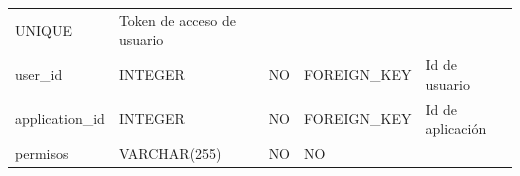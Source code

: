 \documentclass[12pt,a4paperpaper,]{report}
\begin{document}
\begin{longtable}[]{@{}lllll@{}}
\begin{minipage}[t]{0.19\columnwidth}
UNIQUE\strut
\end{minipage} & \begin{minipage}[t]{0.11\columnwidth}\raggedright\strut
Token de acceso de usuario\strut
\end{minipage}\tabularnewline
\begin{minipage}[t]{0.21\columnwidth}\raggedright\strut
user\_id\strut
\end{minipage} & \begin{minipage}[t]{0.19\columnwidth}\raggedright\strut
INTEGER\strut
\end{minipage} & \begin{minipage}[t]{0.16\columnwidth}\raggedright\strut
NO\strut
\end{minipage} & \begin{minipage}[t]{0.19\columnwidth}\raggedright\strut
FOREIGN\_KEY\strut
\end{minipage} & \begin{minipage}[t]{0.11\columnwidth}\raggedright\strut
Id de usuario\strut
\end{minipage}\tabularnewline
\begin{minipage}[t]{0.21\columnwidth}\raggedright\strut
application\_id\strut
\end{minipage} & \begin{minipage}[t]{0.19\columnwidth}\raggedright\strut
INTEGER\strut
\end{minipage} & \begin{minipage}[t]{0.16\columnwidth}\raggedright\strut
NO\strut
\end{minipage} & \begin{minipage}[t]{0.19\columnwidth}\raggedright\strut
FOREIGN\_KEY\strut
\end{minipage} & \begin{minipage}[t]{0.11\columnwidth}\raggedright\strut
Id de aplicación\strut
\end{minipage}\tabularnewline
\begin{minipage}[t]{0.21\columnwidth}\raggedright\strut
permisos\strut
\end{minipage} & \begin{minipage}[t]{0.19\columnwidth}\raggedright\strut
VARCHAR(255)\strut
\end{minipage} & \begin{minipage}[t]{0.16\columnwidth}\raggedright\strut
NO\strut
\end{minipage} & \begin{minipage}[t]{0.19\columnwidth}\raggedright\strut
NO\strut
\end{minipage} & \begin{minipage}[t]{0.11\columnwidth}\raggedright\strut

\end{minipage}
\end{longtable}
\end{document}
